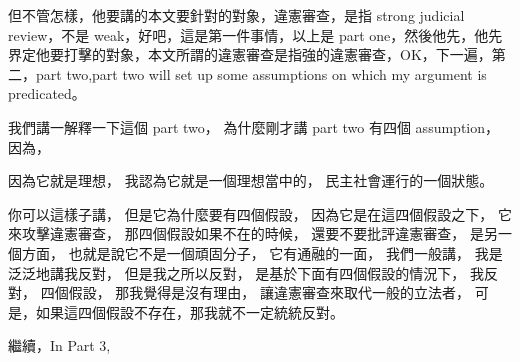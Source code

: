\hypertarget{w06:cue:387}{}但不管怎樣，他要講的本文要針對的對象，違憲審查，是指 strong judicial review，不是 weak，好吧，這是第一件事情，以上是 part one，然後他先，他先界定他要打擊的對象，本文所謂的違憲審查是指強的違憲審查，OK，下一遍，第二，part two,part two will set up some assumptions on which my argument is predicated。

\hypertarget{w06:cue:388}{}我們講一解釋一下這個 part two，
\hypertarget{w06:cue:389}{}為什麼剛才講 part two 有四個 assumption，
\hypertarget{w06:cue:390}{}因為，

\hypertarget{w06:cue:391}{}因為它就是理想，
\hypertarget{w06:cue:392}{}我認為它就是一個理想當中的，
\hypertarget{w06:cue:393}{}民主社會運行的一個狀態。

\hypertarget{w06:cue:394}{}你可以這樣子講，
\hypertarget{w06:cue:395}{}但是它為什麼要有四個假設，
\hypertarget{w06:cue:396}{}因為它是在這四個假設之下，
\hypertarget{w06:cue:397}{}它來攻擊違憲審查，
\hypertarget{w06:cue:398}{}那四個假設如果不在的時候，
\hypertarget{w06:cue:399}{}還要不要批評違憲審查，
\hypertarget{w06:cue:400}{}是另一個方面，
\hypertarget{w06:cue:401}{}也就是說它不是一個頑固分子，
\hypertarget{w06:cue:402}{}它有通融的一面，
\hypertarget{w06:cue:403}{}我們一般講，
\hypertarget{w06:cue:404}{}我是泛泛地講我反對，
\hypertarget{w06:cue:405}{}但是我之所以反對，
\hypertarget{w06:cue:406}{}是基於下面有四個假設的情況下，
\hypertarget{w06:cue:407}{}我反對，
\hypertarget{w06:cue:408}{}四個假設，
\hypertarget{w06:cue:409}{}那我覺得是沒有理由，
\hypertarget{w06:cue:410}{}讓違憲審查來取代一般的立法者，
\hypertarget{w06:cue:411}{}可是，如果這四個假設不存在，那我就不一定統統反對。

\hypertarget{w06:cue:412}{}繼續，In Part 3,

